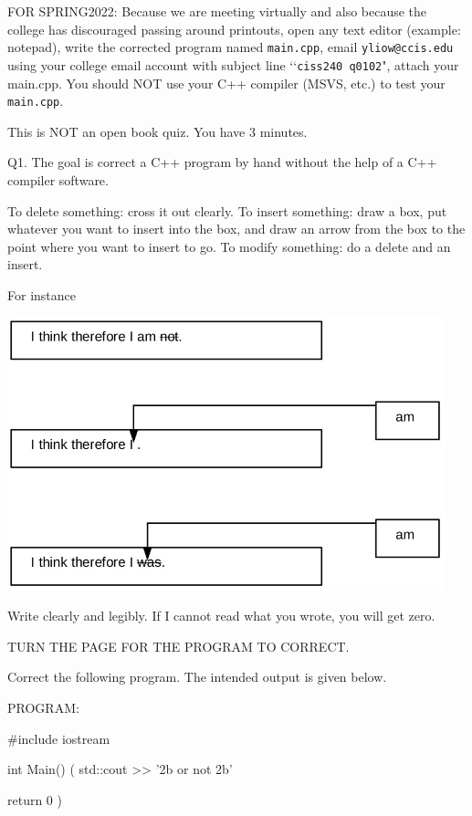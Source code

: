 


\renewcommand\TITLE{Quiz q0102}


\topmatter

FOR SPRING2022: Because we are meeting virtually and also because
the college has discouraged passing around printouts,
open any text editor (example: notepad), write the corrected program
named \verb!main.cpp!,
email \verb!yliow@ccis.edu! using your college email account with
subject line \lq\lq \verb!ciss240 q0102!", attach your main.cpp.
You should NOT use your C++ compiler (MSVS, etc.) to test your \verb!main.cpp!.

This is NOT an open book quiz. 
You have 3 minutes. 

Q1. The goal is correct a C++ program by hand without the help of a C++ 
compiler software.
\begin{tightlist}
\li To delete something: cross it out clearly.
\li To insert something: draw a box,
      put whatever you want to insert into the box, and draw an arrow
      from the box to the point where you want to insert to go.
\li To modify something: do a delete and an insert.
\end{tightlist}
For instance
\begin{center}
\includegraphics[width=5in]{q01-02.jpg}
\end{center}


Write clearly and legibly. If I cannot read what you wrote, you will get zero. 

TURN THE PAGE FOR THE PROGRAM TO CORRECT.

\newpage

Correct the following program. The intended output is given below.



PROGRAM:
{\Large
\begin{console}


#include iostream

int Main()
(
    std::cout >> '2b or not 2b'

    return 0
)


\end{console}
}




